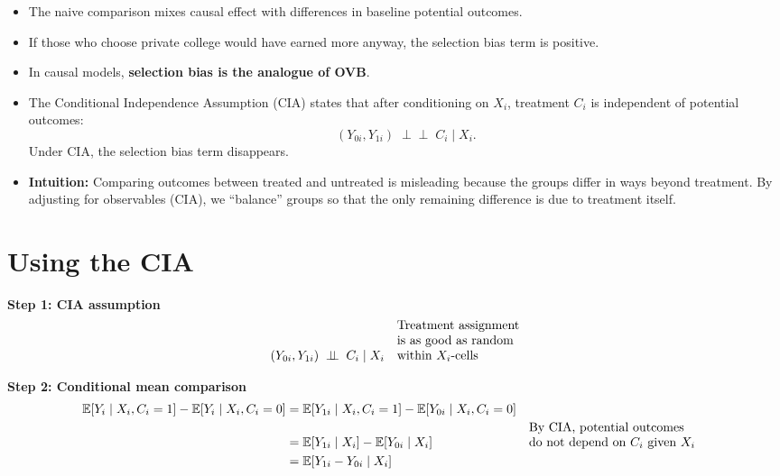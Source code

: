 \documentclass[12pt]{article}
\begin{document}
\begin{itemize}
    \item The naive comparison mixes causal effect with differences in baseline potential outcomes.  
    \item If those who choose private college would have earned more anyway, the selection bias term is positive.  
    \item In causal models, \textbf{selection bias is the analogue of OVB}.  
    \item The Conditional Independence Assumption (CIA) states that after conditioning on $X_i$, treatment $C_i$ is independent of potential outcomes:  
    \[
    (Y_{0i}, Y_{1i}) \;\perp\!\!\!\perp\; C_i \mid X_i.
    \]
    Under CIA, the selection bias term disappears.
    \item \textbf{Intuition:} Comparing outcomes between treated and untreated is misleading because the groups differ in ways beyond treatment. By adjusting for observables (CIA), we “balance” groups so that the only remaining difference is due to treatment itself.
\end{itemize}

\section*{\noindent\textbf{Using the CIA}}

\singlespacing
\noindent \textbf{Step 1: CIA assumption}  
\begin{align}
(Y_{0i}, Y_{1i}) \;\perp\!\!\!\perp\; C_i \mid X_i && \text{\shortstack[l]{Treatment assignment \\ is as good as random \\ within $X_i$-cells}}
\end{align}

\vspace{1em}
\noindent \textbf{Step 2: Conditional mean comparison}  
\begin{align}
\mathbb{E}[Y_i \mid X_i, C_i=1] - \mathbb{E}[Y_i \mid X_i, C_i=0] 
   &= \mathbb{E}[Y_{1i} \mid X_i, C_i=1] - \mathbb{E}[Y_{0i} \mid X_i, C_i=0] \\
   &= \mathbb{E}[Y_{1i} \mid X_i] - \mathbb{E}[Y_{0i} \mid X_i] && \text{\shortstack[l]{By CIA, potential outcomes \\ do not depend on $C_i$ given $X_i$}} \\
   &= \mathbb{E}[Y_{1i} - Y_{0i} \mid X_i] 
\end{align}
\end{document}
